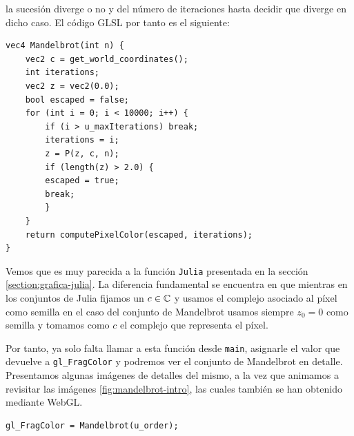 la sucesión diverge o no y del número de iteraciones hasta decidir que diverge en dicho caso. El código GLSL por tanto es el siguiente:

\begin{lstlisting}
vec4 Mandelbrot(int n) {
    vec2 c = get_world_coordinates();
    int iterations;
    vec2 z = vec2(0.0);
    bool escaped = false;
    for (int i = 0; i < 10000; i++) {
        if (i > u_maxIterations) break;
        iterations = i;
        z = P(z, c, n);
        if (length(z) > 2.0) {
        escaped = true;
        break;
        }
    }
    return computePixelColor(escaped, iterations);
}
\end{lstlisting}

Vemos que es muy parecida a la función \verb|Julia| presentada en la sección \ref{section:grafica-julia}. La diferencia fundamental se encuentra en que mientras en los conjuntos de Julia fijamos un $c\in\mathbb{C}$ y usamos el complejo asociado al píxel como semilla en el caso del conjunto de Mandelbrot usamos siempre $z_0=0$ como semilla y tomamos como $c$ el complejo que representa el píxel.

Por tanto, ya solo falta llamar a esta función desde \verb|main|, asignarle el valor que devuelve a \verb|gl_FragColor| y podremos ver el conjunto de Mandelbrot en detalle. Presentamos algunas imágenes de detalles del mismo, a la vez que animamos a revisitar las imágenes \ref{fig:mandelbrot-intro}, las cuales también se han obtenido mediante WebGL.

\begin{lstlisting}
gl_FragColor = Mandelbrot(u_order);
\end{lstlisting}

